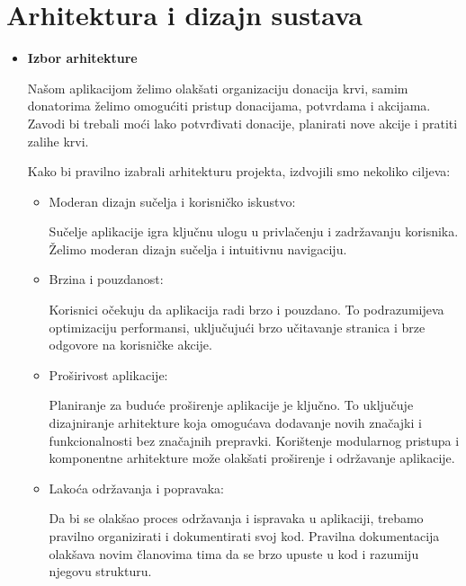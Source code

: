 \documentclass[12pt]{article}
\begin{document}
\section{Arhitektura i dizajn sustava}

\begin{itemize}
	\item \textbf{Izbor arhitekture}
	      	      
	      Našom aplikacijom želimo olakšati organizaciju donacija krvi, samim
	      donatorima želimo omogućiti pristup donacijama, potvrdama i akcijama.
	      Zavodi bi trebali moći lako potvrđivati donacije, planirati nove akcije i pratiti
	      zalihe krvi.
	      	      
	      Kako bi pravilno izabrali arhitekturu projekta, izdvojili smo nekoliko
	      ciljeva:
	      \begin{itemize}
	      	\item Moderan dizajn sučelja i korisničko iskustvo:
	      	      	      	      
	      	      Sučelje aplikacije igra ključnu ulogu u privlačenju i zadržavanju korisnika.
	      	      Želimo moderan dizajn sučelja i intuitivnu navigaciju.
	      	      	      	      
	      	\item Brzina i pouzdanost:
	      	      	      	      
	      	      Korisnici očekuju da aplikacija radi brzo i pouzdano. To podrazumijeva
	      	      optimizaciju performansi, uključujući brzo učitavanje stranica i brze odgovore
	      	      na korisničke akcije.
	      	      	      	      
	      	\item Proširivost aplikacije:
	      	      	      	      
	      	      Planiranje za buduće proširenje aplikacije je ključno. To uključuje
	      	      dizajniranje arhitekture koja omogućava dodavanje novih značajki i
	      	      funkcionalnosti bez značajnih prepravki. Korištenje modularnog pristupa
	      	      i komponentne arhitekture može olakšati proširenje i održavanje aplikacije.
	      	      	      	      
	      	\item Lakoća održavanja i popravaka:
	      	      	      	      
	      	      Da bi se olakšao proces održavanja i ispravaka u aplikaciji, trebamo
	      	      pravilno organizirati i dokumentirati svoj kod. Pravilna dokumentacija
	      	      olakšava novim članovima tima da se brzo upuste u kod i razumiju njegovu
	      	      strukturu.
	      	      	      	      

\end{itemize}
\end{itemize}
\end{document}
